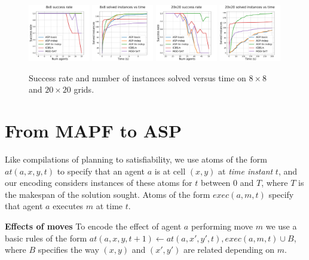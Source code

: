\documentclass[letterpaper]{article} %
\begin{document}
\begin{figure}
    \includegraphics[width=0.24\textwidth]{graphs/8x8succ.pdf}
    \includegraphics[width=0.24\textwidth]{graphs/8x8runtime.pdf}
    \includegraphics[width=0.24\textwidth]{graphs/20x20succ.pdf}
    \includegraphics[width=0.24\textwidth]{graphs/20x20runtime.pdf}
    \caption{Success rate and number of instances solved versus time on $8\times 8$ and $20\times 20$ grids.}
    \label{figure}
\end{figure}


\section{From MAPF to ASP}
Like compilations of planning to satisfiability, we use atoms of the form $at(a,x,y,t)$ to specify that an agent $a$ is at cell $(x,y)$ at \emph{time instant} $t$, and our encoding considers instances of these atoms for $t$ between $0$ and $T$, where $T$ is the makespan of the solution sought. Atoms of the form $exec(a,m,t)$ specify that agent $a$ executes $m$ at time $t$.

\noindent\textbf{Effects of moves} To encode the effect of agent $a$ performing move $m$ we use a basic rules of the form $at(a,x,y,t+1)\leftarrow at(a,x',y',t),exec(a,m,t)\cup B$, where $B$ specifies the way $(x,y)$ and $(x',y')$ are related depending on $m$.
\end{document}
